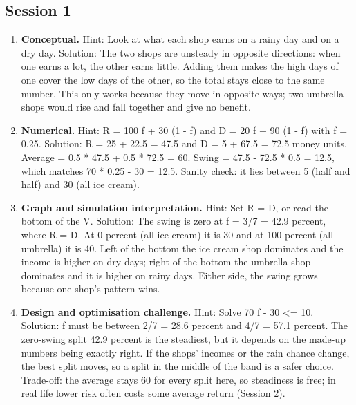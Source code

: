 \documentclass[11pt,a4paper]{article}
\begin{document}
\subsection*{Session 1}
\begin{enumerate}[nosep]
\item \textbf{Conceptual.} Hint: Look at what each shop earns on a rainy day and on a dry day. Solution: The two shops are unsteady in opposite directions: when one earns a lot, the other earns little. Adding them makes the high days of one cover the low days of the other, so the total stays close to the same number. This only works because they move in opposite ways; two umbrella shops would rise and fall together and give no benefit.
\item \textbf{Numerical.} Hint: R = 100 f + 30 (1 - f) and D = 20 f + 90 (1 - f) with f = 0.25. Solution: R = 25 + 22.5 = 47.5 and D = 5 + 67.5 = 72.5 money units. Average = 0.5 * 47.5 + 0.5 * 72.5 = 60. Swing = \textbar{}47.5 - 72.5\textbar{} * 0.5 = 12.5, which matches \textbar{}70 * 0.25 - 30\textbar{} = 12.5. Sanity check: it lies between 5 (half and half) and 30 (all ice cream).
\item \textbf{Graph and simulation interpretation.} Hint: Set R = D, or read the bottom of the V. Solution: The swing is zero at f = 3/7 = 42.9 percent, where R = D. At 0 percent (all ice cream) it is 30 and at 100 percent (all umbrella) it is 40. Left of the bottom the ice cream shop dominates and the income is higher on dry days; right of the bottom the umbrella shop dominates and it is higher on rainy days. Either side, the swing grows because one shop's pattern wins.
\item \textbf{Design and optimisation challenge.} Hint: Solve \textbar{}70 f - 30\textbar{} \textless{}= 10. Solution: f must be between 2/7 = 28.6 percent and 4/7 = 57.1 percent. The zero-swing split 42.9 percent is the steadiest, but it depends on the made-up numbers being exactly right. If the shops' incomes or the rain chance change, the best split moves, so a split in the middle of the band is a safer choice. Trade-off: the average stays 60 for every split here, so steadiness is free; in real life lower risk often costs some average return (Session 2).
\end{enumerate}
\end{document}
